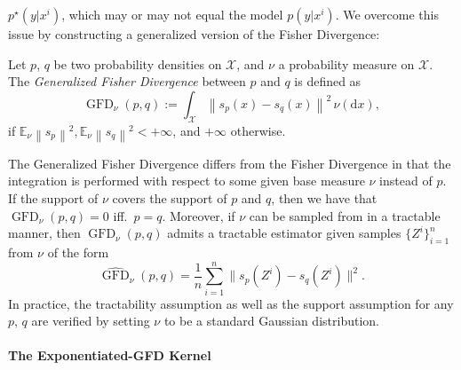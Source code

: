 \documentclass{uai2023} %
\begin{document}
$ p^{\star}(y|x^{i}) $, which may or may not equal the model $ p(y|x^{i}) $.
We overcome this issue by constructing a generalized version of the Fisher Divergence:
\begin{definition}
    Let $ p $,  $ q $ be two probability densities on $ \mathcal  X $, and
    $ \nu $ a probability measure on $ \mathcal  X $. The \emph{Generalized
    Fisher Divergence} between $ p $ and $ q $ is defined as
\begin{equation*} \label{eq:gfd}
\operatorname{GFD}_{\nu}(p, q) := \int_{\mathcal  X} \left \| s_p(x) - s_q(x)  \right \|^2 \,\nu(\mathrm{d}x),
\end{equation*}
if $ \mathbb{E}_{ \nu }\left \| s_p  \right \|^2, \mathbb{E}_{ \nu }\left \|
s_q  \right \|^2 < +\infty $, and $ +\infty $ otherwise.
\end{definition}
The Generalized Fisher Divergence differs from the Fisher Divergence in that
the integration is performed with respect to some given base measure $ \nu $
instead of $ p $. If the support of $ \nu $ covers the support of $ p $ and $ q
$,  then we have that $ \operatorname{GFD}_{\nu}(p, q) = 0 $ iff.\ $ p = q $.
Moreover, if $ \nu $ can be sampled from in a tractable manner, then $
\operatorname{GFD}_{\nu}(p, q)$ admits a tractable estimator given samples $ \{ Z^{i}
\}_{i=1}^{n}  $ from $ \nu $ of the form
\begin{equation*}
\widehat{ \operatorname{GFD}}_{\nu}(p, q) = \frac{1}{n} \sum_{i=1}^{n} \| s_p(Z^{i}) - s_q(Z^{i})  \|^2.
\end{equation*}
In practice, the tractability assumption as well as the support assumption for
any $ p $, $ q $ are verified by setting $ \nu $ to be a standard Gaussian
distribution.


\paragraph{The Exponentiated-GFD Kernel}
\end{document}
